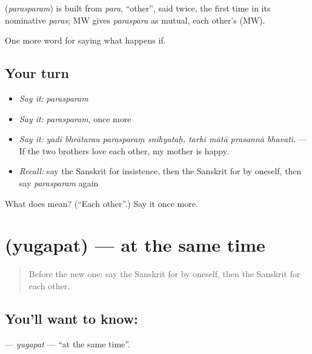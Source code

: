 \begin{cousinweb}
\textbf{} (\emph{parasparam}) is built from \emph{para}, \textquotedblleft{}other\textquotedblright{}, said twice, the first time in its nominative \emph{paras}; MW gives \emph{paraspara} as mutual, each other's (MW).
\end{cousinweb}

\begin{grammarlens}[title={What you've built}]
One more word for saying what happens if.
\end{grammarlens}

\subsection*{Your turn}
\begin{itemize}
\raggedright
  \item \emph{Say it:} \emph{parasparam}
  \item \emph{Say it:} \emph{parasparam}, once more
  \item \emph{Say it:} \emph{yadi bhrātarau parasparaṃ snihyataḥ, tarhi mātā prasannā bhavati.} — If the two brothers love each other, my mother is happy.
  \item \emph{Recall:} say the Sanskrit for insistence, then the Sanskrit for by oneself, then say \emph{parasparam} again
\end{itemize}

\begin{tcolorbox}[breakable,colback=teal!4,colframe=teal!35!black,title={Before you move on}]
What does  mean? (\textquotedblleft{}Each other\textquotedblright{}.) Say it once more.
\end{tcolorbox}
\section[\texorpdfstring{\sk{युगपत्} (yugapat)}{युगपत् (yugapat)}]{ (yugapat) — at the same time}

\label{lesson:SA-C544-yugapat}



\begin{quote}
Before the new one: say the Sanskrit for by oneself, then the Sanskrit for each other.
\end{quote}

\subsection*{You'll want to know: }
\textbf{} — \emph{yugapat} — \textquotedblleft{}at the same time\textquotedblright{}.

